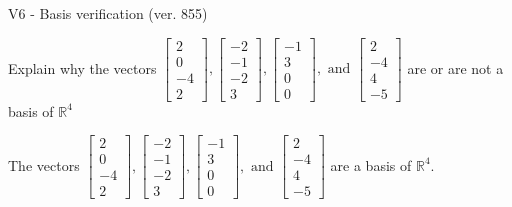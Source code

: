 \begin{exercise}
  \begin{exerciseTitle}V6 - Basis verification (ver. 855)\end{exerciseTitle}
  \begin{exerciseStatement}
    Explain why the vectors \(\left[\begin{array}{r}
2 \\
0 \\
-4 \\
2
\end{array}\right] , \left[\begin{array}{r}
-2 \\
-1 \\
-2 \\
3
\end{array}\right] , \left[\begin{array}{r}
-1 \\
3 \\
0 \\
0
\end{array}\right] , \text{ and } \left[\begin{array}{r}
2 \\
-4 \\
4 \\
-5
\end{array}\right]\) are or are not a basis of \(\mathbb{R}^4\)	


  \end{exerciseStatement}
  \begin{exerciseAnswer}
   The vectors \(\left[\begin{array}{r}
2 \\
0 \\
-4 \\
2
\end{array}\right] , \left[\begin{array}{r}
-2 \\
-1 \\
-2 \\
3
\end{array}\right] , \left[\begin{array}{r}
-1 \\
3 \\
0 \\
0
\end{array}\right] , \text{ and } \left[\begin{array}{r}
2 \\
-4 \\
4 \\
-5
\end{array}\right]\) 
  	 are  a basis of \(\mathbb{R}^4\).
  


  \end{exerciseAnswer}
\end{exercise}